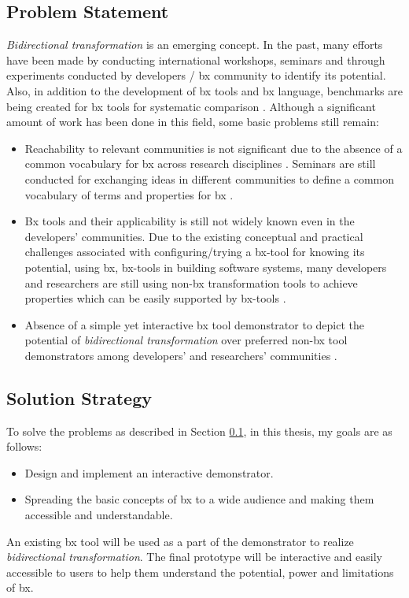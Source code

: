 \subsection{Problem Statement}\label{subsec:probstmt}
\textit{Bidirectional transformation} is an emerging concept. In the past, many efforts have been made by conducting international workshops, seminars and through experiments conducted by developers / bx community to identify its potential. Also, in addition to the development of bx tools and bx language, benchmarks are being created for bx tools for systematic comparison \cite{benchmark-BX}.
\newline\newline  Although a significant amount of work has been done in this field, some basic problems still remain:
\begin{itemize}
	\item {Reachability to relevant communities is not significant due to the absence of a common vocabulary for bx across research disciplines \cite{bx-theoryandappl}. Seminars are still conducted for exchanging ideas in different communities to define a common vocabulary of terms and properties for bx \cite{bx-dagstuhl}.}	
	\item {Bx tools and their applicability is still not widely known even in the developers' communities. Due to the existing conceptual and practical challenges associated with configuring/trying a bx-tool for knowing its potential, using bx, bx-tools in building software systems, many developers and researchers are still using non-bx transformation tools to achieve properties which can be easily supported by bx-tools \cite{bx-theoryandappl}.}
	\item {Absence of a simple yet interactive bx tool demonstrator to depict the potential of \textit{bidirectional transformation} over preferred non-bx tool demonstrators among developers' and researchers' communities \cite{bx-theoryandappl}.}
\end{itemize}

\subsection{Solution Strategy}\label{subsec:solution}
To solve the problems as described in Section \ref{subsec:probstmt}, in this thesis, my goals are as follows:
\begin{itemize} 
\item {Design and implement an interactive demonstrator.} 
\item {Spreading the basic concepts of bx to a wide audience and making them accessible and understandable.}
\end{itemize}
An existing bx tool will be used as a part of the demonstrator to realize \textit{bidirectional transformation}. The final prototype will be interactive and easily accessible to users to help them understand the potential, power and limitations of bx.

